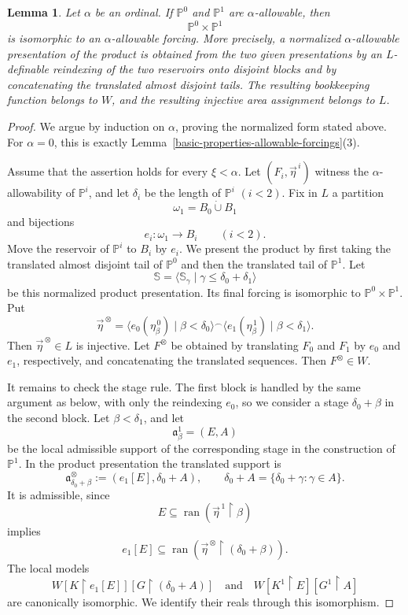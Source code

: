 \documentclass[a4paper,11pt]{article}
\newtheorem{lemma}[theorem]{Lemma}
\newcommand{\forceP}{\mathbb{P}}
\newcommand{\forceS}{\mathbb{S}}
\begin{document}
\begin{lemma}
\label{1allowableclosedunderproducts}
\label{alphaallowableclosedunderproducts}
Let $\alpha$ be an ordinal.  If $\forceP^0$ and $\forceP^1$ are
$\alpha$-allowable, then
\[
   \forceP^0\times\forceP^1
\]
is isomorphic to an $\alpha$-allowable forcing.  More precisely, a normalized
$\alpha$-allowable presentation of the product is obtained from the two given
presentations by an $L$-definable reindexing of the two reservoirs onto
disjoint blocks and by concatenating the translated almost disjoint tails.  The
resulting bookkeeping function belongs to $W$, and the resulting injective area
assignment belongs to $L$.
\end{lemma}

\begin{proof}
We argue by induction on $\alpha$, proving the normalized form stated above.
For $\alpha=0$, this is exactly
Lemma~\ref{basic-properties-allowable-forcings}(3).

Assume that the assertion holds for every $\xi<\alpha$.  Let
$(F_i,\vec\eta^{\,i})$ witness the $\alpha$-allowability of
$\forceP^i$, and let $\delta_i$ be the length of $\forceP^i$
$(i<2)$.  Fix in $L$ a partition
\[
   \omega_1=B_0\mathbin{\dot\cup}B_1
\]
and bijections
\[
   e_i:\omega_1\longrightarrow B_i
   \qquad(i<2).
\]
Move the reservoir of $\forceP^i$ to $B_i$ by $e_i$.  We present the product
by first taking the translated almost disjoint tail of $\forceP^0$ and then
the translated tail of $\forceP^1$.  Let
\[
   \forceS=\langle\forceS_\gamma\mid
      \gamma\leq\delta_0+\delta_1\rangle
\]
be this normalized product presentation.  Its final forcing is isomorphic to
$\forceP^0\times\forceP^1$.  Put
\[
   \vec\eta^{\,\otimes}
   =
   \langle e_0(\eta^{\,0}_\beta)\mid\beta<\delta_0\rangle
    {}^\frown
    \langle e_1(\eta^{\,1}_\beta)\mid\beta<\delta_1\rangle.
\]
Then $\vec\eta^{\,\otimes}\in L$ is injective.  Let
$F^\otimes$ be obtained by translating $F_0$ and $F_1$ by $e_0$ and
$e_1$, respectively, and concatenating the translated sequences.  Then
$F^\otimes\in W$.

It remains to check the stage rule.  The first block is handled by the same
argument as below, with only the reindexing $e_0$, so we consider a stage
$\delta_0+\beta$ in the second block.  Let $\beta<\delta_1$, and let
\[
   \mathfrak a^1_\beta=(E,A)
\]
be the local admissible support of the corresponding stage in the construction
of $\forceP^1$.  In the product presentation the translated support is
\[
   \mathfrak a^\otimes_{\delta_0+\beta}
   :=(e_1[E],\delta_0+A),
   \qquad
   \delta_0+A=\{\delta_0+\gamma:\gamma\in A\}.
\]
It is admissible, since
\[
   E\subseteq
   \operatorname{ran}(\vec\eta^{\,1}\upharpoonright\beta)
\]
implies
\[
   e_1[E]\subseteq
   \operatorname{ran}
      (\vec\eta^{\,\otimes}\upharpoonright(\delta_0+\beta)).
\]
The local models
\[
   W[K\upharpoonright e_1[E]]
    [G\upharpoonright(\delta_0+A)]
   \quad\text{and}\quad
   W[K^1\upharpoonright E][G^1\upharpoonright A]
\]
are canonically isomorphic.  We identify their reals through this isomorphism.


\end{proof}
\end{document}
